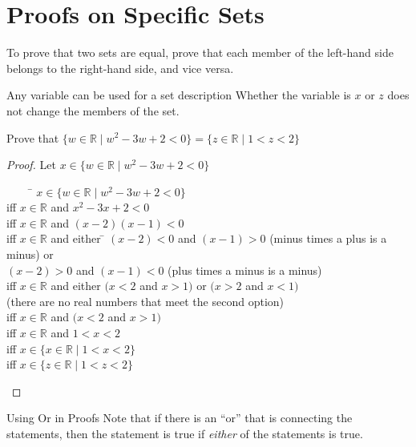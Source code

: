 \documentclass[../notes.tex]{subfiles}
\begin{document}
		\section{Proofs on Specific Sets}
			To prove that two sets are equal, prove that each member of the left-hand side belongs to the right-hand side, and vice versa.
			\begin{sidenote}{Any variable can be used for a set description}
				Whether the variable is $x$ or $z$ does not change the members of the set.
			\end{sidenote}
			\begin{example}
				Prove that $\{w \in \mathbb{R} \mid w^{2} - 3w + 2 < 0\} = \{z \in \mathbb{R} \mid 1 < z < 2\}$
				\begin{proof}
					Let $x \in \{w \in \mathbb{R} \mid w^{2} - 3w + 2 < 0\}$
					\begin{tabbing}
						$\qquad$ \= $x \in \{w \in \mathbb{R} \mid w^{2} - 3w + 2 < 0\}$\\
						iff      \> $x \in \mathbb{R}$ and $x^{2} - 3x + 2 < 0$\\
						iff      \> $x \in \mathbb{R}$ and $(x - 2)(x - 1) < 0$\\
						iff      \> $x \in \mathbb{R}$ and either \= $(x - 2) < 0$ and $(x - 1) > 0$ (minus times a plus is a minus) or\\
						         \>                               \> $(x - 2) > 0$ and $(x - 1) < 0$ (plus times a minus is a minus)\\
						iff      \> $x \in \mathbb{R}$ and either \> $(x < 2$ and $x > 1)$ or $(x > 2$ and $x < 1)$\\
										 \>                               \> (there are no real numbers that meet the second option)\\
						iff      \> $x \in \mathbb{R}$ and $(x < 2$ and $x > 1)$\\
						iff      \> $x \in \mathbb{R}$ and $1 < x < 2$\\
						iff      \> $x \in \{x \in \mathbb{R} \mid 1 < x < 2\}$\\
						iff      \> $x \in \{z \in \mathbb{R} \mid 1 < z < 2\}$
					\end{tabbing}
				\end{proof}
			\end{example}
			\begin{sidenote}{Using Or in Proofs}
				Note that if there is an ``or'' that is connecting the statements, then the statement is true if \emph{either} of the statements is true.
			\end{sidenote}
\end{document}
